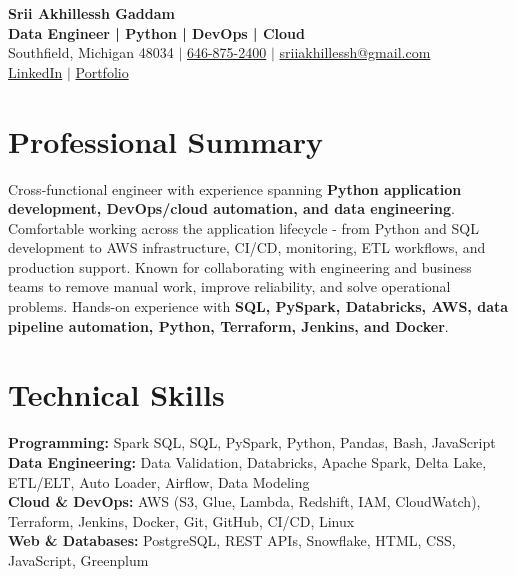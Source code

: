 \documentclass[letterpaper,10pt]{article}
\begin{document}
\fontsize{9.35pt}{10.45pt}\selectfont

\begin{center}
    {\LARGE \textbf{Srii Akhillessh Gaddam}} \\[-1pt]
    \textbf{Data Engineer | Python | DevOps | Cloud} \\[2pt]
    Southfield, Michigan 48034 $|$
    \href{tel:6468752400}{646-875-2400} $|$
    \href{mailto:sriiakhillessh@gmail.com}{sriiakhillessh@gmail.com} \\[1pt]
    \href{https://www.linkedin.com/in/srii-akhiilessh-gaddam-b48668191/}{LinkedIn} $|$
    \href{https://sriiakhillesshg.github.io/portfolio/}{Portfolio}
\end{center}
\vspace{-8pt}

\section{Professional Summary}
\small{Cross-functional engineer with experience spanning \textbf{Python application development, DevOps/cloud automation, and data engineering}. Comfortable working across the application lifecycle - from Python and SQL development to AWS infrastructure, CI/CD, monitoring, ETL workflows, and production support. Known for collaborating with engineering and business teams to remove manual work, improve reliability, and solve operational problems. Hands-on experience with \textbf{SQL, PySpark, Databricks, AWS, data pipeline automation, Python, Terraform, Jenkins, and Docker}.}

\section{Technical Skills}
\small{
\textbf{Programming:} Spark SQL, SQL, PySpark, Python, Pandas, Bash, JavaScript \\
\textbf{Data Engineering:} Data Validation, Databricks, Apache Spark, Delta Lake, ETL/ELT, Auto Loader, Airflow, Data Modeling \\
\textbf{Cloud \& DevOps:} AWS (S3, Glue, Lambda, Redshift, IAM, CloudWatch), Terraform, Jenkins, Docker, Git, GitHub, CI/CD, Linux \\
\textbf{Web \& Databases:} PostgreSQL, REST APIs, Snowflake, HTML, CSS, JavaScript, Greenplum
}

\end{document}
